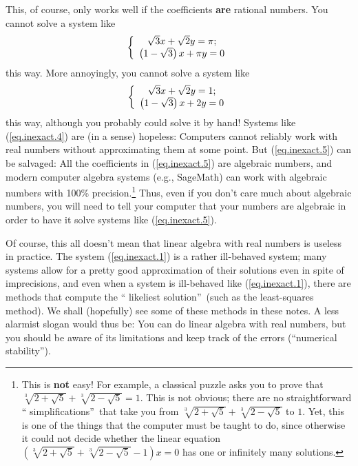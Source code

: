 \documentclass[numbers=enddot,12pt,final,onecolumn,notitlepage]{scrartcl}%
\theoremstyle{definition}
\begin{document}
\begin{itemize}
This, of course, only works well if the coefficients \textbf{are} rational
numbers. You cannot solve a system like%
\begin{equation}
\left\{
\begin{array}
[c]{c}%
\sqrt{3}x+\sqrt{2}y=\pi;\\
\left(  1-\sqrt{3}\right)  x+\pi y=0
\end{array}
\right.  \label{eq.inexact.4}%
\end{equation}
this way. More annoyingly, you cannot solve a system like%
\begin{equation}
\left\{
\begin{array}
[c]{c}%
\sqrt{3}x+\sqrt{2}y=1;\\
\left(  1-\sqrt{3}\right)  x+2y=0
\end{array}
\right.  \label{eq.inexact.5}%
\end{equation}
this way, although you probably could solve it by hand! Systems like
(\ref{eq.inexact.4}) are (in a sense) hopeless: Computers cannot reliably work
with real numbers without approximating them at some point. But
(\ref{eq.inexact.5}) can be salvaged: All the coefficients in
(\ref{eq.inexact.5}) are algebraic numbers, and modern computer algebra
systems (e.g., SageMath) can work with algebraic numbers with 100\%
precision.\footnote{This is \textbf{not} easy! For example, a classical puzzle
asks you to prove that $\sqrt[3]{2+\sqrt{5}}+\sqrt[3]{2-\sqrt{5}}=1$. This is
not obvious; there are no straightforward \textquotedblleft
simplifications\textquotedblright\ that take you from $\sqrt[3]{2+\sqrt{5}%
}+\sqrt[3]{2-\sqrt{5}}$ to $1$. Yet, this is one of the things that the
computer must be taught to do, since otherwise it could not decide whether the
linear equation $\left(  \sqrt[3]{2+\sqrt{5}}+\sqrt[3]{2-\sqrt{5}}-1\right)
x=0$ has one or infinitely many solutions.} Thus, even if you don't care much
about algebraic numbers, you will need to tell your computer that your numbers
are algebraic in order to have it solve systems like (\ref{eq.inexact.5}).

Of course, this all doesn't mean that linear algebra with real numbers is
useless in practice. The system (\ref{eq.inexact.1}) is a rather ill-behaved
system; many systems allow for a pretty good approximation of their solutions
even in spite of imprecisions, and even when a system is ill-behaved like
(\ref{eq.inexact.1}), there are methods that compute the \textquotedblleft
likeliest solution\textquotedblright\ (such as the least-squares method). We
shall (hopefully) see some of these methods in these notes. A less alarmist
slogan would thus be: You can do linear algebra with real numbers, but you
should be aware of its limitations and keep track of the errors
(\textquotedblleft numerical stability\textquotedblright).
\end{itemize}
\end{document}
